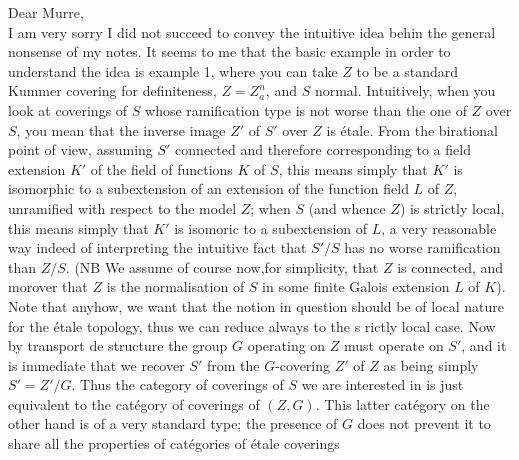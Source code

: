 
Dear Murre,\\

I am very sorry I did not succeed to convey the intuitive idea behin the general nonsense of my notes. It seems to me that the basic example in order to understand the idea is example 1, where you can take $Z$ to be a standard Kummer covering for definiteness, $Z=Z_a^n$, and $S$ normal. Intuitively, when you look at coverings  of $S$ whose ramification type is not worse than the one of $Z$ over $S$, you mean that the  inverse image $Z'$ of $S'$ over $Z$ is étale.  From the birational point of view, assuming $S'$ connected and therefore corresponding to a field extension $K'$ of the field of functions $K$ of $S$, this means simply that $K'$ is isomorphic to a subextension of an extension  of the function field $L$ of $Z$, unramified with respect to the model $Z$; when $S$ (and whence $Z$) is strictly local,  this means simply that $K'$ is isomoric to a subextension of $L$, a very reasonable way indeed of interpreting the intuitive fact that $S'/S$ has no worse ramification than $Z/S$. (NB We assume of course now,for simplicity, that $Z$ is connected, and morover that $Z$ is the normalisation of $S$ in some finite Galois extension $L$ of $K$). Note that anyhow, we want that the notion in question should be of local nature for the étale topology, thus we can reduce always to the s rictly local case. Now by transport de structure the group $G$ operating on $Z$ must operate on $S'$, and it is immediate that we recover $S'$ from the $G$-covering $Z'$ of $Z$ as being simply $S'=Z'/G$. Thus  the category of coverings of $S$ we are interested in is just equivalent to the catégory of  coverings of $(Z,G)$. This latter catégory on the other hand is of a very standard type; the presence of $G$ does not prevent it to share all the properties of catégories of étale coverings
